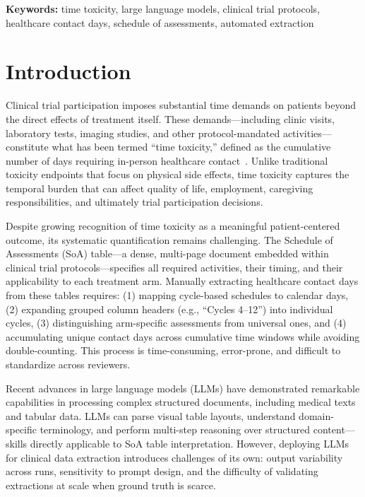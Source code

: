 \documentclass[11pt]{article}
\begin{document}
\textbf{Keywords:} time toxicity, large language models, clinical trial protocols, healthcare contact days, schedule of assessments, automated extraction

\section{Introduction}

Clinical trial participation imposes substantial time demands on patients beyond the direct effects of treatment itself. These demands---including clinic visits, laboratory tests, imaging studies, and other protocol-mandated activities---constitute what has been termed ``time toxicity,'' defined as the cumulative number of days requiring in-person healthcare contact~\citep{gupta2022time}. Unlike traditional toxicity endpoints that focus on physical side effects, time toxicity captures the temporal burden that can affect quality of life, employment, caregiving responsibilities, and ultimately trial participation decisions.

Despite growing recognition of time toxicity as a meaningful patient-centered outcome, its systematic quantification remains challenging. The Schedule of Assessments (SoA) table---a dense, multi-page document embedded within clinical trial protocols---specifies all required activities, their timing, and their applicability to each treatment arm. Manually extracting healthcare contact days from these tables requires: (1) mapping cycle-based schedules to calendar days, (2) expanding grouped column headers (e.g., ``Cycles 4--12'') into individual cycles, (3) distinguishing arm-specific assessments from universal ones, and (4) accumulating unique contact days across cumulative time windows while avoiding double-counting. This process is time-consuming, error-prone, and difficult to standardize across reviewers.

Recent advances in large language models (LLMs) have demonstrated remarkable capabilities in processing complex structured documents, including medical texts and tabular data. LLMs can parse visual table layouts, understand domain-specific terminology, and perform multi-step reasoning over structured content---skills directly applicable to SoA table interpretation. However, deploying LLMs for clinical data extraction introduces challenges of its own: output variability across runs, sensitivity to prompt design, and the difficulty of validating extractions at scale when ground truth is scarce.
\end{document}
